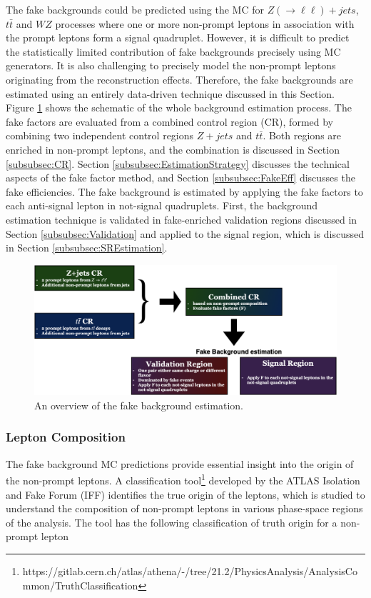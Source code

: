 The fake backgrounds could be predicted using the MC for $Z(\rightarrow \ell \ell) + jets $, $t\bar{t}$ and $WZ$ processes where one or more non-prompt leptons in association with the prompt leptons form a signal quadruplet. However, it is difficult to predict the statistically limited contribution of fake backgrounds precisely using MC generators. It is also challenging to precisely model the non-prompt leptons originating from the reconstruction effects. Therefore, the fake backgrounds are estimated using an entirely data-driven technique discussed in this Section. Figure \ref{fig:FakeBkgOverview} shows the schematic of the whole background estimation process. The fake factors are evaluated from a combined control region (CR), formed by combining two independent control regions $Z+jets$ and $t\bar{t}$. Both regions are enriched in non-prompt leptons, and the combination is discussed in Section \ref{subsubsec:CR}. Section \ref{subsubsec:EstimationStrategy} discusses the technical aspects of the fake factor method, and Section \ref{subsubsec:FakeEff} discusses the fake efficiencies. The fake background is estimated by applying the fake factors to each anti-signal lepton in not-signal quadruplets. First, the background estimation technique is validated in fake-enriched validation regions discussed in Section \ref{subsubsec:Validation} and applied to the signal region, which is discussed in Section \ref{subsubsec:SREstimation}. 

\begin{figure}
    \centering
    \includegraphics[width=.99\linewidth, angle =0]{figures/Analysis/Background/FakeBackgroundOverview.png}  
    \caption{An overview of the fake background estimation.\label{fig:FakeBkgOverview}}
\end{figure}

\subsubsection{Lepton Composition}
\label{subsubsec:LepComp}
The fake background MC predictions provide essential insight into the origin of the non-prompt leptons. A classification tool\footnote{https://gitlab.cern.ch/atlas/athena/-/tree/21.2/PhysicsAnalysis/AnalysisCommon/TruthClassification} developed by the ATLAS Isolation and Fake Forum (IFF) identifies the true origin of the leptons, which is studied to understand the composition of non-prompt leptons in various phase-space regions of the analysis. The tool has the following classification of truth origin for a non-prompt lepton

